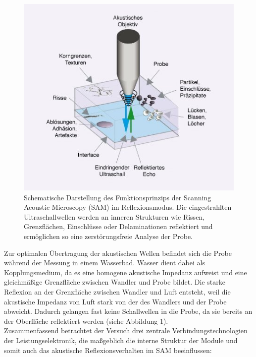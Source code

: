  \newpage
\vspace{0.2cm}
\begin{figure}
    \centering
    \includegraphics[scale=0.8]{Bilder/samtheorie}
    \caption{Schematische Darstellung des Funktionsprinzips der Scanning Acoustic Microscopy (SAM) im Reflexionsmodus. Die eingestrahlten Ultraschallwellen werden an inneren Strukturen wie Rissen, Grenzflächen, Einschlüsse oder Delaminationen reflektiert und ermöglichen so eine zerstörungsfreie Analyse der Probe.\cite{pvateplaSAM}}
    \vspace{0.2cm}
    \label{Abb.1: Schematische Darstellung des Funktionsprinzips der Scanning Acoustic Microscopy (SAM) im Reflexionsmodus. Die eingestrahlten Ultraschallwellen werden an inneren Strukturen wie Rissen, Grenzflächen, Einschlüsse oder Delaminationen reflektiert und ermöglichen so eine zerstörungsfreie Analyse der Probe. }
\end{figure} 
\vspace{0.2cm}
Zur optimalen Übertragung der akustischen Wellen befindet sich die Probe während der Messung in einem Wasserbad. Wasser dient dabei als Kopplungsmedium, da es eine homogene akustische Impedanz aufweist und eine gleichmäßige Grenzfläche zwischen Wandler und Probe bildet.
Die starke Reflexion an der Grenzfläche zwischen Wandler und Luft entsteht, weil die akustische Impedanz von Luft stark von der des Wandlers und der Probe abweicht. Dadurch gelangen fast keine Schallwellen in die Probe, da sie bereits an der Oberfläche reflektiert werden (siehe Abbildung 1).\\
Zusammenfassend betrachtet der Versuch drei zentrale Verbindungstechnologien der Leistungselektronik, die maßgeblich die interne Struktur der Module und somit auch das akustische Reflexionsverhalten im SAM beeinflussen:\\

